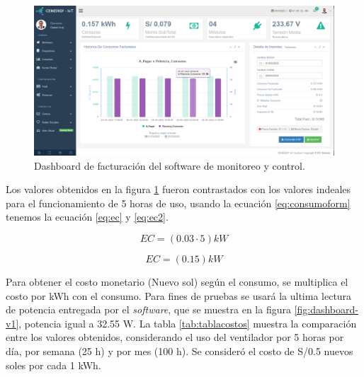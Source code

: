 \begin{landscape} %
\begin{figure}[htpb]
\centering 
\includegraphics[width=1.7\textwidth]{./Figures/test/consumo/consumo.png}
\caption{Dashboard de facturación del software de monitoreo y control.}
\label{fig:dashboard-consumo}
\end{figure}
\end{landscape} %

Los valores obtenidos en la figura \ref{fig:dashboard-consumo} fueron contrastados con los valores indeales para el funcionamiento de 5 horas de uso, usando la ecuación \ref{eq:consumoform} tenemos la ecuación \ref{eq:ec} y \ref{eq:ec2}. 

\begin{equation}
	\label{eq:ec}
	EC = \left( 0.03 \cdot 5 \right) kW
\end{equation}

\begin{equation}
	\label{eq:ec2}
	EC = \left( 0.15 \right) kW
\end{equation}

Para obtener el costo monetario (Nuevo sol) según el consumo, se multiplica el costo por kWh con el consumo. Para fines de pruebas se usará la ultima lectura de potencia entregada por el \emph{software}, que se muestra en la figura \ref{fig:dashboard-v1}, potencia igual a 32.55 W. La tabla \ref{tab:tablacostos} muestra la comparación entre los valores obtenidos, considerando el uso del ventilador por 5 horas por día, por semana (25 h) y por mes (100 h). Se consideró el costo de S/0.5 nuevos soles por cada 1 kWh.

